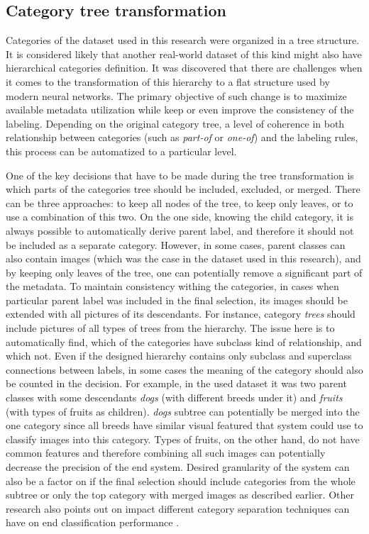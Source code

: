 \subsection{Category tree transformation}
Categories of the dataset used in this research were organized in a tree structure. It is considered likely that another real-world dataset of this kind might also have hierarchical categories definition. It was discovered that there are challenges when it comes to the transformation of this hierarchy to a flat structure used by modern neural networks. The primary objective of such change is to maximize available metadata utilization while keep or even improve the consistency of the labeling. Depending on the original category tree, a level of coherence in both relationship between categories (such as \textit{part-of} or \textit{one-of}) and the labeling rules, this process can be automatized to a particular level.

One of the key decisions that have to be made during the tree transformation is which parts of the categories tree should be included, excluded, or merged. There can be three approaches: to keep all nodes of the tree, to keep only leaves, or to use a combination of this two. On the one side, knowing the child category, it is always possible to automatically derive parent label, and therefore it should not be included as a separate category. However, in some cases, parent classes can also contain images (which was the case in the dataset used in this research), and by keeping only leaves of the tree, one can potentially remove a significant part of the metadata. To maintain consistency withing the categories, in cases when particular parent label was included in the final selection, its images should be extended with all pictures of its descendants.  For instance, category \textit{trees} should include pictures of all types of trees from the hierarchy. The issue here is to automatically find, which of the categories have subclass kind of relationship, and which not. Even if the designed hierarchy contains only subclass and superclass connections between labels, in some cases the meaning of the category should also be counted in the decision. For example, in the used dataset it was two parent classes with some descendants \textit{dogs} (with different breeds under it) and \textit{fruits} (with types of fruits as children). \textit{dogs} subtree can potentially be merged into the one category since all breeds have similar visual featured that system could use to classify images into this category. Types of fruits, on the other hand, do not have common features and therefore combining all such images can potentially decrease the precision of the end system. Desired granularity of the system can also be a factor on if the final selection should include categories from the whole subtree or only the top category with merged images as described earlier. Other research also points out on impact different category separation techniques can have on end classification performance \cite{Dong2013Subcategory-AwareClassification}.

